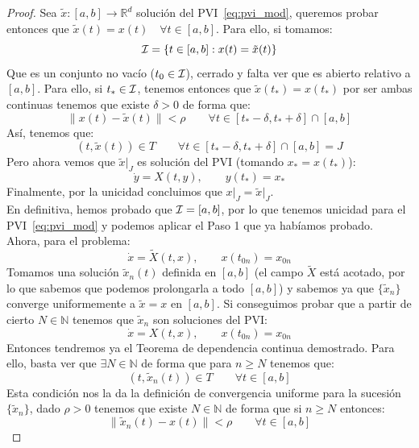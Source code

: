 \begin{proof}
    \noindent
    Sea $\tilde{x}:[a,b]\to \mathbb{R}^d$ solución del PVI~\eqref{eq:pvi_mod}, queremos probar entonces que $\tilde{x}(t) = x(t)\quad \forall t\in [a,b]$. Para ello, si tomamos:
    \begin{equation*}
        \mathcal{I} = \{t\in [a,b] : x(t) = \tilde{x}(t)\}
    \end{equation*}
    Que es un conjunto no vacío ($t_0\in \mathcal{I}$), cerrado y falta ver que es abierto relativo a $[a,b]$. Para ello, si $t_\ast \in \mathcal{I}$, tenemos entonces que $\tilde{x}(t_\ast) = x(t_\ast)$ por ser ambas continuas tenemos que existe $\delta>0$ de forma que:
    \begin{equation*}
        \|x(t) - \tilde{x}(t)\| < \rho \qquad \forall t\in [t_\ast-\delta,t_\ast+\delta]\cap[a,b]
    \end{equation*}
    Así, tenemos que:
    \begin{equation*}
        (t,\tilde{x}(t))\in T \qquad \forall t\in [t_\ast-\delta,t_\ast+\delta]\cap[a,b] = J
    \end{equation*}
    Pero ahora vemos que $\tilde{x}\big|_J$ es solución del PVI (tomando $x_\ast = x(t_\ast)$):
    \begin{equation*}
        \dot{y} = X(t,y), \qquad y(t_\ast) = x_\ast 
    \end{equation*}
    Finalmente, por la unicidad concluimos que $x\big|_J = \tilde{x}\big|_J$.\\

    \noindent
    En definitiva, hemos probado que $\mathcal{I}= [a,b]$, por lo que tenemos unicidad para el PVI~\eqref{eq:pvi_mod} y podemos aplicar el Paso 1 que ya habíamos probado.\\

    \noindent
    Ahora, para el problema:
    \begin{equation*}
        \dot{x} =\tilde{X}(t,x), \qquad x(t_{0n}) = x_{0n}
    \end{equation*}
    Tomamos una solución $\tilde{x}_n(t)$ definida en $[a,b]$ (el campo $\tilde{X}$ está acotado, por lo que sabemos que podemos prolongarla a todo $[a,b]$) y sabemos ya que $\{\tilde{x}_n\}$ converge uniformemente a $\tilde{x} = x$ en $[a,b]$. Si conseguimos probar que a partir de cierto $N\in \mathbb{N}$ tenemos que $\tilde{x}_n$ son soluciones del PVI:
    \begin{equation*}
        \dot{x} = X(t,x), \qquad x(t_{0n}) = x_{0n}
    \end{equation*}
    Entonces tendremos ya el Teorema de dependencia continua demostrado. Para ello, basta ver que $\exists N\in \mathbb{N}$ de forma que para $n\geq N$ tenemos que:
    \begin{equation*}
        (t,\tilde{x}_n(t)) \in T\qquad \forall t\in [a,b]
    \end{equation*}
    Esta condición nos la da la definición de convergencia uniforme para la sucesión $\{\tilde{x}_n\}$, dado $\rho >0$ tenemos que existe $N\in \mathbb{N}$ de forma que si $n\geq N$ entonces:
    \begin{equation*}
        \|\tilde{x}_n(t) - x(t)\| < \rho \qquad \forall t\in [a,b]
    \end{equation*}
\end{proof}

